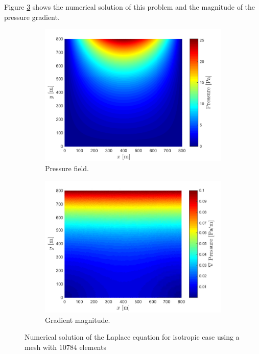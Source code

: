 \documentclass[review]{elsarticle}
\begin{document}
Figure \ref{fig:soltexas} shows the numerical solution of this problem and the  magnitude of the pressure gradient.
\begin{figure}[H]
	\centering
	\begin{subfigure}[b]{0.45\textwidth}
		\includegraphics[width=\textwidth]{./Figures/Examples/Laplacian/soltexas1}
		\caption{Pressure field.}
		\label{fig:soltexas1}
	\end{subfigure}
	\begin{subfigure}[b]{0.45\textwidth}
		\includegraphics[width=\textwidth]{./Figures/Examples/Laplacian/soltexas1gp}
		\caption{Gradient magnitude.}
		\label{fig:soltexas1gp}
	\end{subfigure}
	\caption{Numerical solution of the Laplace equation for isotropic case using a mesh with $10784$ elements}
	\label{fig:soltexas}
\end{figure}
\end{document}

